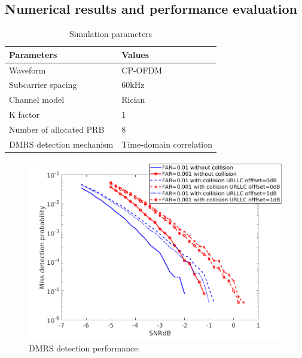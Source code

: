 \documentclass{ieeeaccess}
\begin{document}
\subsection{Numerical results and performance evaluation}

\begin{table}[htbp]
\caption{Simulation parameters}
\begin{center}
\begin{tabular}{|p{8em}|p{8em}|}
 \hline
 \textbf{Parameters} & \textbf{Values}\\
 \hline
 Waveform & CP-OFDM\\
 \hline
 Subcarrier spacing & 60kHz\\
 \hline
 Channel model & Rician\\
 \hline
 K factor & 1\\
 \hline
 Number of allocated PRB & 8\\
 \hline
 DMRS detection mechanism & Time-domain correlation\\
 

 
 \hline
\end{tabular}
\label{tab5}
\end{center}

\end{table}

\begin{figure}[htbp]
\centerline{\includegraphics[scale=0.33]{fig16.png}}
\caption{DMRS detection performance.}
\label{fig16}
\vspace{-3mm}
\end{figure}
\end{document}
